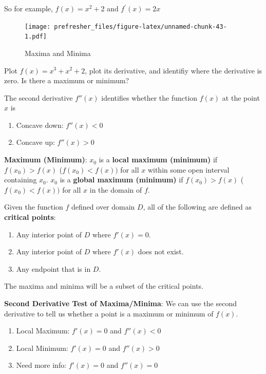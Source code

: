 \documentclass[]{book}
\providecommand{\tightlist}{%
  \setlength{\itemsep}{0pt}\setlength{\parskip}{0pt}}
\theoremstyle{definition}
\theoremstyle{definition}
\theoremstyle{definition}
\theoremstyle{remark}
\let\BeginKnitrBlock\begin \let\EndKnitrBlock\end
\begin{document}
So for example, \(f(x) = x^2 + 2\) and \(f^\prime(x) = 2x\)

\begin{figure}
\centering
\texttt{[image: prefresher\_files/figure-latex/unnamed-chunk-43-1.pdf]}
\caption{\label{fig:unnamed-chunk-43}Maxima and Minima}
\end{figure}

\BeginKnitrBlock{exercise}[Plotting a mazimum and minimum]
\protect\hypertarget{exr:unnamed-chunk-44}{}{\label{exr:unnamed-chunk-44} {} }Plot \(f(x)=x^3+ x^2 + 2\), plot its derivative, and identifiy where the derivative is zero. Is there a maximum or minimum?
\EndKnitrBlock{exercise}

The second derivative \(f''(x)\) identifies whether the function \(f(x)\) at the point \(x\) is

\begin{enumerate}
\def\labelenumi{\arabic{enumi}.}
\tightlist
\item
  Concave down: \(f''(x)<0\)
\item
  Concave up: \(f''(x)>0\)
\end{enumerate}

\textbf{Maximum (Minimum)}: \(x_0\) is a \textbf{local maximum (minimum)} if \(f(x_0)>f(x)\) (\(f(x_0)<f(x))\) for all \(x\) within some open interval containing \(x_0\). \(x_0\) is a \textbf{global maximum (minimum)} if \(f(x_0)>f(x)\) (\(f(x_0)<f(x))\) for all \(x\) in the domain of \(f\).

Given the function \(f\) defined over domain \(D\), all of the following are defined as \textbf{critical points}:

\begin{enumerate}
\def\labelenumi{\arabic{enumi}.}
\tightlist
\item
  Any interior point of \(D\) where \(f'(x)=0\).
\item
  Any interior point of \(D\) where \(f'(x)\) does not exist.
\item
  Any endpoint that is in \(D\).
\end{enumerate}

The maxima and minima will be a subset of the critical points.

\textbf{Second Derivative Test of Maxima/Minima}: We can use the second derivative to tell us whether a point is a maximum or minimum of \(f(x)\).

\begin{enumerate}
\def\labelenumi{\arabic{enumi}.}
\tightlist
\item
  Local Maximum: \(f'(x)=0\) and \(f''(x)<0\)
\item
  Local Minimum: \(f'(x)=0\) and \(f''(x)>0\)
\item
  Need more info: \(f'(x)=0\) and \(f''(x)=0\)
\end{enumerate}
\end{document}
